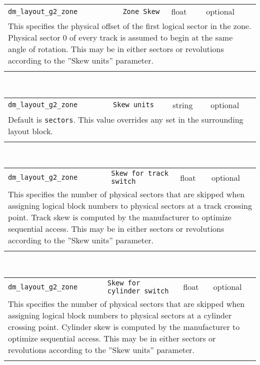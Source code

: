\noindent 
\begin{tabular}{|p{\lpmodwidth}|p{\lpnamewidth}|p{0.5in}|p{0.5in}|}
\cline{1-4}
\texttt{dm\_layout\_g2\_zone} & \texttt{Zone Skew} & float & optional \\ 
\cline{1-4}
\multicolumn{4}{|p{6in}|}{
This specifies the physical offset of the first logical sector in the
zone. Physical sector 0 of every track is assumed to begin at the
same angle of rotation. This may be in either sectors or revolutions
according to the ''Skew units'' parameter.
}\\ 
\cline{1-4}
\multicolumn{4}{p{5in}}{}\\
\end{tabular}\\ 
\noindent 
\begin{tabular}{|p{\lpmodwidth}|p{\lpnamewidth}|p{0.5in}|p{0.5in}|}
\cline{1-4}
\texttt{dm\_layout\_g2\_zone} & \texttt{Skew units} & string & optional \\ 
\cline{1-4}
\multicolumn{4}{|p{6in}|}{
Default is \texttt{sectors}. This value overrides any set in the
surrounding layout block.
}\\ 
\cline{1-4}
\multicolumn{4}{p{5in}}{}\\
\end{tabular}\\ 
\noindent 
\begin{tabular}{|p{\lpmodwidth}|p{\lpnamewidth}|p{0.5in}|p{0.5in}|}
\cline{1-4}
\texttt{dm\_layout\_g2\_zone} & \texttt{Skew for track switch} & float & optional \\ 
\cline{1-4}
\multicolumn{4}{|p{6in}|}{
This specifies the number of physical sectors that are skipped when
assigning logical block numbers to physical sectors at a track
crossing point. Track skew is computed by the manufacturer to
optimize sequential access. This may be in either sectors or
revolutions according to the ''Skew units'' parameter.
}\\ 
\cline{1-4}
\multicolumn{4}{p{5in}}{}\\
\end{tabular}\\ 
\noindent 
\begin{tabular}{|p{\lpmodwidth}|p{\lpnamewidth}|p{0.5in}|p{0.5in}|}
\cline{1-4}
\texttt{dm\_layout\_g2\_zone} & \texttt{Skew for cylinder switch} & float & optional \\ 
\cline{1-4}
\multicolumn{4}{|p{6in}|}{
This specifies the number of physical sectors that are skipped when
assigning logical block numbers to physical sectors at a cylinder
crossing point. Cylinder skew is computed by the manufacturer to
optimize sequential access. This may be in either sectors or
revolutions according to the ''Skew units'' parameter.
}\\ 
\cline{1-4}
\multicolumn{4}{p{5in}}{}\\
\end{tabular}\\ 
